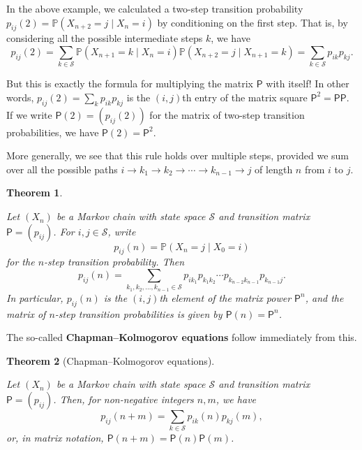 \documentclass[
  a4paper,
]{article}
\newtheorem{theorem}{Theorem}[section]
\theoremstyle{definition}
\theoremstyle{definition}
\theoremstyle{definition}
\theoremstyle{remark}
\begin{document}
In the above example, we calculated a two-step transition probability \(p_{ij}(2) = \mathbb P (X_{n+2} = j \mid X_n = i)\) by conditioning on the first step. That is, by considering all the possible intermediate steps \(k\), we have
\[ p_{ij}(2) = \sum_{k\in\mathcal S} \mathbb P (X_{n+1} = k \mid X_n = i)\mathbb P (X_{n+2} = j \mid X_{n+1} = k) = \sum_{k\in\mathcal S} p_{ik}p_{kj} . \]

But this is exactly the formula for multiplying the matrix \(\mathsf P\) with itself! In other words, \(p_{ij}(2) = \sum_{k} p_{ik}p_{kj}\) is the \((i,j)\)th entry of the matrix square \(\mathsf P^2 = \mathsf{PP}\). If we write \(\mathsf P(2) = (p_{ij}(2))\) for the matrix of two-step transition probabilities, we have \(\mathsf P(2) = \mathsf P^2\).

More generally, we see that this rule holds over multiple steps, provided we sum over all the possible paths \(i\to k_1 \to k_2 \to \cdots \to k_{n-1} \to j\) of length \(n\) from \(i\) to \(j\).

\begin{theorem}
\protect\hypertarget{thm:thm-n-step}{}\label{thm:thm-n-step}

Let \((X_n)\) be a Markov chain with state space \(\mathcal S\) and transition matrix \(\mathsf P = (p_{ij})\). For \(i,j \in \mathcal S\), write
\[ p_{ij}(n) = \mathbb P(X_n = j \mid X_0 = i) \]
for the \(n\)-step transition probability. Then
\[ p_{ij}(n) = \sum_{k_1, k_2, \dots, k_{n-1} \in \mathcal S} p_{ik_1} p_{k_1k_2} \cdots p_{k_{n-2}k_{n-1}} p_{k_{n-1}j} . \]
In particular, \(p_{ij}(n)\) is the \((i,j)\)th element of the matrix power \(\mathsf P^n\), and the matrix of \(n\)-step transition probabilities is given by \(\mathsf P(n) = \mathsf P^n\).

\end{theorem}

The so-called \textbf{Chapman--Kolmogorov equations} follow immediately from this.

\begin{theorem}[Chapman–Kolmogorov equations]
\protect\hypertarget{thm:c-k}{}\label{thm:c-k}

Let \((X_n)\) be a Markov chain with state space \(\mathcal S\) and transition matrix \(\mathsf P = (p_{ij})\). Then, for non-negative integers \(n,m\), we have
\[ p_{ij}(n+m) = \sum_{k \in \mathcal S} p_{ik}(n)p_{kj}(m) , \]
or, in matrix notation, \(\mathsf P(n+m) = \mathsf P(n)\mathsf P(m)\).

\end{theorem}
\end{document}
